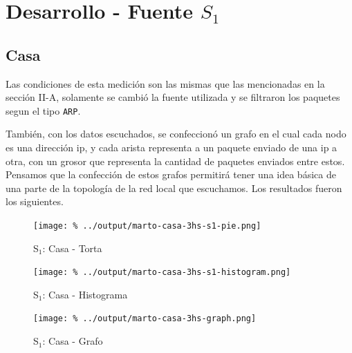 \documentclass[final,inline,a4paper,narroweqnarray]{ieee}
\begin{document}
\section{Desarrollo - Fuente $S_1$}
  \subsection{Casa}

  Las condiciones de esta medición son las mismas que las mencionadas
  en la sección II-A, solamente se cambió la fuente utilizada y se
  filtraron los paquetes segun el tipo \texttt{ARP}.
  
  También, con los datos escuchados, se confeccionó un grafo en el
  cual cada nodo es una dirección ip, y cada arista representa a un
  paquete enviado de una ip a otra, con un grosor que representa la
  cantidad de paquetes enviados entre estos. Pensamos que la
  confección de estos grafos permitirá tener una idea básica de una
  parte de la topología de la red local que escuchamos. Los resultados
  fueron los siguientes.


    \begin{figure}[ht]\begin{center}
      \texttt{[image: \%
      ../output/marto-casa-3hs-s1-pie.png]}
      \vspace{-2em}
      \caption{S$_1$: Casa - Torta}
      \label{marto-casa-3hs-s1-pie}
    \end{center}\end{figure}

    \begin{figure}[ht]\begin{center}
      \texttt{[image: \%
      ../output/marto-casa-3hs-s1-histogram.png]}
      \vspace{-2em}
      \caption{S$_1$: Casa - Histograma}
      \label{marto-casa-3hs-s1-histogram}
    \end{center}\end{figure}	

    \begin{figure}[ht]\begin{center}
      \texttt{[image: \%
      ../output/marto-casa-3hs-graph.png]}
      \vspace{-2em}
      \caption{S$_1$: Casa - Grafo}
      \label{marto-casa-3hs-graph}
    \end{center}\end{figure}	
  
\end{document}
